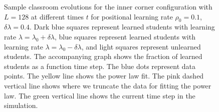 \begin{figure}[htbp!]
   \caption{Sample classroom evolutions for the inner corner configuration with $L=128$ at different times $t$ for positional learning rate $\rho_0=0.1$, $\delta\lambda = 0.4$.
   Dark blue squares represent learned students with learning rate $\lambda = \lambda_0 + \delta\lambda$, blue squares represent learned students with learning rate $\lambda = \lambda_0 - \delta\lambda$, and light squares represent unlearned students.
   The accompanying graph shows the fraction of learned students as a function time step.
   The blue dots represent data points. 
   The yellow line shows the power law fit.
   The pink dashed vertical line shows where we truncate the data for fitting the power law.
   The green vertical line shows the current time step in the simulation.
   }
   \label{fig:2DBPCAIH sample class evolution low rho}
\end{figure}

